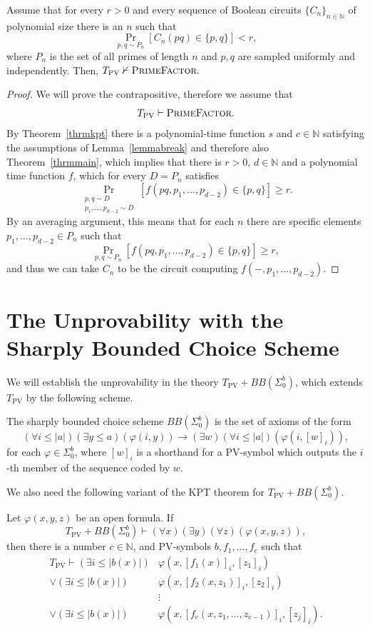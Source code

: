 \documentclass{lmcs}
\newcommand{\PV}{\text{PV}}
\newcommand{\abs}[1]{\lvert #1\rvert}
\newcommand{\PrimeFactor}{\textsc{PrimeFactor}}
\newcommand{\NN}{\mathbb{N}}
\begin{document}
\begin{cor}\label{crllpv}
    Assume that for every $r>0$ and every sequence of Boolean circuits $\{C_n\}_{n\in\NN}$ of polynomial size there is an $n$ such that
    \[\Pr_{p,q\sim P_n}[C_n(pq) \in \{p,q\}] < r,\]
    where $P_n$ is the set of all primes of length $n$ and $p,q$ are sampled uniformly and independently. Then,
    $T_{\PV} \nvdash \PrimeFactor.$
\end{cor}
\begin{proof}
    We will prove the contrapositive, therefore we assume that \[T_{\PV}\vdash \PrimeFactor.\] By Theorem~\ref{thrmkpt} there is a polynomial-time function $s$ and $c\in \NN$ satisfying the assumptions of Lemma~\ref{lemmabreak} and therefore also Theorem~\ref{thrmmain}, which implies that there is $r>0$, $d\in \NN$ and a polynomial time function $f$, which for every $D=P_n$ satisfies
        \[\Pr_{\substack{p,q \sim D\\ p_1,\dots,p_{d-2} \sim D}}  \left[f(pq,p_1,\dots,p_{d-2}) \in \{p,q\}\right]\geq r.\]
    By an averaging argument, this means that for each $n$ there are specific elements $p_1,\dots,p_{d-2}\in P_n$ such that 
    \[\Pr_{p,q\sim P_n}[f(pq,p_1,\dots,p_{d-2}) \in \{p,q\}]\geq r,\]
    and thus we can take $C_n$ to be the circuit computing $f(-,p_1,\dots,p_{d-2})$.
\end{proof}

\section{The Unprovability with the Sharply Bounded Choice Scheme}\label{secpvbb}

We will establish the unprovability in the theory $T_{\PV}+BB(\Sigma^b_0)$, which extends $T_{\PV}$ by the following scheme.

\begin{defi}
    The sharply bounded choice scheme $BB(\Sigma^b_0)$ is the set of axioms of the form
    \[(\forall i\leq \abs{a})(\exists y\leq a)(\varphi(i,y)) \to (\exists w)(\forall i \leq \abs{a})(\varphi(i,[w]_i)),\]
    for each $\varphi\in \Sigma^b_0$, where $[w]_i$ is a shorthand for a $\PV$-symbol which outputs the $i$-th member of the sequence coded by $w$.
\end{defi}

We also need the following variant of the KPT theorem for $T_{\PV}+BB(\Sigma^b_0)$.


\begin{thmC}\label{thrmkptbb}
    Let $\varphi(x,y,z)$ be an open formula. If
    \[T_{\PV} + BB(\Sigma^b_0) \vdash (\forall x)(\exists y)(\forall z)(\varphi(x,y,z)),\]
    then there is a number $c\in\NN$, and $\PV$-symbols $b,f_1,\dots,f_c$ such that
    \begin{align*}
        T_{\PV} \vdash (\exists i\leq \abs{b(x)})&\varphi(x,[f_1(x)]_i,[z_1]_i)\\ \lor (\exists i \leq \abs{b(x)})&\varphi(x,[f_2(x,z_1)]_i,[z_2]_i) \\ & \vdots  \\ \lor (\exists i\leq \abs{b(x)})&\varphi(x,[f_c(x,z_1,\dots,z_{c-1})]_i,[z_j]_i).
    \end{align*}
\end{thmC}
\end{document}
